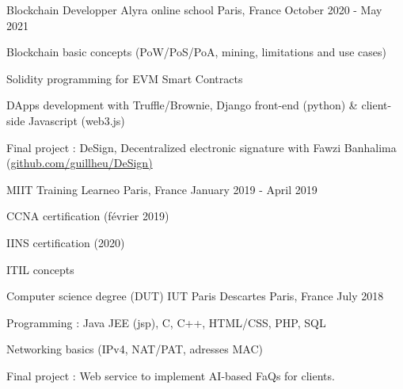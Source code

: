 
\begin{cventries}
    \cventry
    {Blockchain Developper} %
    {Alyra online school} %
    {Paris, France} %
    {October 2020 - May 2021} %
    {
      \begin{cvitems} %
        \item Blockchain basic concepts (PoW/PoS/PoA, mining, limitations and use cases)
        \item Solidity programming for EVM Smart Contracts
        \item DApps development with Truffle/Brownie, Django front-end (python) \& client-side Javascript (web3.js)
        \item Final project : DeSign, Decentralized electronic signature with Fawzi Banhalima  (\underline{github.com/guillheu/DeSign)}
      \end{cvitems}
    }
    \cventry
    {MIIT Training} %
    {Learneo} %
    {Paris, France} %
    {January 2019 - April 2019} %
    {
      \begin{cvitems} %
        \item CCNA certification (février 2019)
        \item IINS certification (2020)
        \item ITIL concepts\\
      \end{cvitems}
    }
    \cventry
    {Computer science degree (DUT)} %
    {IUT Paris Descartes} %
    {Paris, France} %
    {July 2018} %
    {
      \begin{cvitems} %
        \item Programming : Java JEE (jsp), C, C++, HTML/CSS, PHP, SQL
        \item Networking basics (IPv4, NAT/PAT, adresses MAC)
        \item {Final project : Web service to implement AI-based FaQs for clients.}
      \end{cvitems}
    }
\end{cventries}

